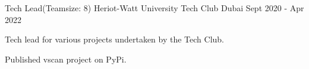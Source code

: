 
\begin{cventries}

  \cventry
    {Tech Lead(Teamsize: 8)} %
    {Heriot-Watt University Tech Club} %
    {Dubai} %
    {Sept 2020 - Apr 2022} %
    {
      \begin{cvitems} %
        \item {Tech lead for  various projects undertaken by the Tech Club.}
        \item {Published vscan project on PyPi.}
      \end{cvitems}
    }

\end{cventries}
